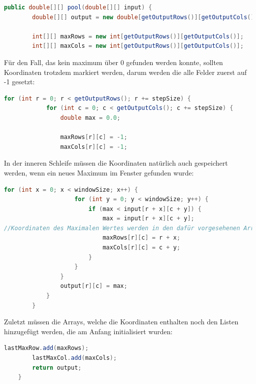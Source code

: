 \documentclass[12pt]{article}
\begin{document}
\begin{lstlisting}[language=Java]
public double[][] pool(double[][] input) {
        double[][] output = new double[getOutputRows()][getOutputCols()];

        int[][] maxRows = new int[getOutputRows()][getOutputCols()];
        int[][] maxCols = new int[getOutputRows()][getOutputCols()];   
\end{lstlisting}
Für den Fall, das kein maximum über 0 gefunden werden konnte, sollten Koordinaten trotzdem markiert werden, darum werden die alle Felder zuerst auf -1 gesetzt:
\begin{lstlisting}[language=Java]
        for (int r = 0; r < getOutputRows(); r += stepSize) {
            for (int c = 0; c < getOutputCols(); c += stepSize) {
                double max = 0.0;

                maxRows[r][c] = -1;
                maxCols[r][c] = -1;
\end{lstlisting}
In der inneren Schleife müssen die Koordinaten natürlich auch gespeichert werden, wenn ein neues Maximum im Fenster gefunden wurde:
\begin{lstlisting}[language=Java]
                for (int x = 0; x < windowSize; x++) {
                    for (int y = 0; y < windowSize; y++) {
                        if (max < input[r + x][c + y]) {
                            max = input[r + x][c + y];
//Koordinaten des Maximalen Wertes werden in den dafür vorgesehenen Arrays gespeichert
                            maxRows[r][c] = r + x;
                            maxCols[r][c] = c + y;
                        }
                    }
                }
                output[r][c] = max;
            }
        }
\end{lstlisting}
Zuletzt müssen die Arrays, welche die Koordinaten enthalten noch den Listen hinzugefügt werden, die am Anfang initialisiert wurden:
\begin{lstlisting}[language=Java]
        lastMaxRow.add(maxRows);
        lastMaxCol.add(maxCols);
        return output;
    }
\end{lstlisting}
\end{document}
